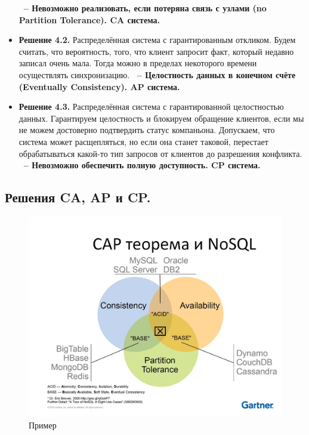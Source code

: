 \documentclass{article}
\begin{document}
\begin{itemize}
    \color{red}
    \newline \textbf{~-- Невозможно реализовать, если потеряна связь с узлами (no Partition Tolerance). CA система.}
    \color{black}
    \item \textbf{Решение 4.2.} Распределённая система с гарантированным откликом.
    \newline
    Будем считать, что вероятность, того, что клиент запросит факт, который недавно записал очень мала. Тогда можно в пределах некоторого времени осуществлять синхронизацию. 
    \color{red}
    \newline \textbf{~-- Целостность данных в конечном счёте (Eventually Consistency). AP система.}
    \color{black}
    \item \textbf{Решение 4.3.} Распределённая система с гарантированной целостностью данных.
    \newline Гарантируем целостность и блокируем обращение клиентов, если мы не можем достоверно подтвердить статус компаньона. Допускаем, что система может расщепляться, но если она станет таковой, перестает обрабатываться какой-то тип запросов от клиентов до разрешения конфликта.
    \color{red}
    \newline \textbf{~-- Невозможно обеспечить полную доступность. CP система.}
    \color{black}
\end{itemize}

\subsection{Решения CA, AP и CP.}

\begin{figure}[H]
    \centering
    \includegraphics[width = .7\linewidth]{img3}
    \caption{Пример}
\end{figure}
\end{document}
